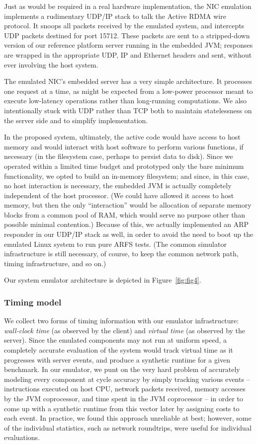 \documentclass[10pt]{article}
\begin{document}
Just as would be required in a real hardware implementation, the NIC
emulation implements a rudimentary UDP/IP stack to talk the Active
RDMA wire protocol. It snoops all packets received by the emulated
system, and intercepts UDP packets destined for port 15712. These
packets are sent to a stripped-down version of our reference platform
server running in the embedded JVM; responses are wrapped in the
appropriate UDP, IP and Ethernet headers and sent, without ever
involving the host system.

The emulated NIC's embedded server has a very simple architecture. It
processes one request at a time, as might be expected from a low-power
processor meant to execute low-latency operations rather than
long-running computations. We also intentionally stuck with UDP rather
than TCP both to maintain statelessness on the server side and to
simplify implementation.

In the proposed system, ultimately, the active code would have access
to host memory and would interact with host software to perform
various functions, if necessary (in the filesystem case, perhaps to
persist data to disk). Since we operated within a limited time budget
and prototyped only the bare minimum functionality, we opted to build
an in-memory filesystem; and since, in this case, no host interaction
is necessary, the embedded JVM is actually completely independent of
the host processor. (We could have allowed it access to host memory,
but then the only ``interaction'' would be allocation of separate
memory blocks from a common pool of RAM, which would serve no purpose
other than possible minimal contention.) Because of this, we actually
implemented an ARP responder in our UDP/IP stack as well, in order to
avoid the need to boot up the emulated Linux system to run pure ARFS
tests. (The common simulator infrastructure is still necessary, of
course, to keep the common network path, timing infrastructure, and so
on.)

Our system emulator architecture is depicted in Figure~\ref{fig:fig4}.

\subsubsection{Timing model}

We collect two forms of timing information with our emulator
infrastructure: \emph{wall-clock time} (as observed by the client) and
\emph{virtual time} (as observed by the server). Since the emulated
components may not run at uniform speed, a completely accurate
evaluation of the system would track virtual time as it progresses
with server events, and produce a synthetic runtime for a given
benchmark. In our emulator, we punt on the very hard problem of
accurately modeling every component at cycle accuracy by simply
tracking various events -- instructions executed on host CPU, network
packets received, memory accesses by the JVM coprocessor, and time
spent in the JVM coprocessor -- in order to come up with a synthetic
runtime from this vector later by assigning costs to each event. In
practice, we found this approach unreliable at best; however, some of
the individual statistics, such as network roundtrips, were useful for
individual evaluations.
\end{document}

